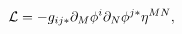 \begin{equation}
{\cal L}=-g_{ij*}\partial_M \phi^i \partial_N \phi^{j*} \eta^{MN} ,
\label{eq:NLSM6D}
\end{equation}

